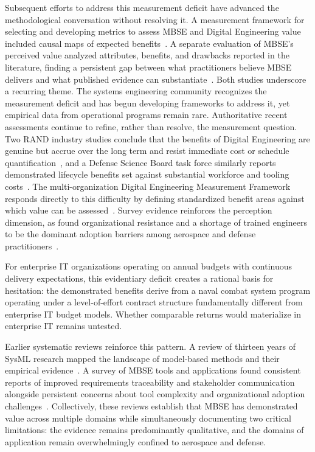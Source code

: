 Subsequent efforts to address this measurement deficit have advanced the methodological conversation without resolving it. A measurement framework for selecting and developing metrics to assess MBSE and Digital Engineering value included causal maps of expected benefits~\parencite{Henderson_2023_Metrics}. A separate evaluation of MBSE's perceived value analyzed attributes, benefits, and drawbacks reported in the literature, finding a persistent gap between what practitioners believe MBSE delivers and what published evidence can substantiate~\parencite{Campo_2023}. Both studies underscore a recurring theme. The systems engineering community recognizes the measurement deficit and has begun developing frameworks to address it, yet empirical data from operational programs remain rare. Authoritative recent assessments continue to refine, rather than resolve, the measurement question. Two RAND industry studies conclude that the benefits of Digital Engineering are genuine but accrue over the long term and resist immediate cost or schedule quantification~\parencite{RAND_DE_Supply_2024, RAND_DE_CostBenefit_2024}, and a Defense Science Board task force similarly reports demonstrated lifecycle benefits set against substantial workforce and tooling costs~\parencite{DSB_DE_2024}. The multi-organization Digital Engineering Measurement Framework responds directly to this difficulty by defining standardized benefit areas against which value can be assessed~\parencite{PSM_DE_Measurement_2022}. Survey evidence reinforces the perception dimension, as \citeauthor{Brown_Zaidi_2025} found organizational resistance and a shortage of trained engineers to be the dominant adoption barriers among aerospace and defense practitioners~\parencite{Brown_Zaidi_2025}.

For enterprise IT organizations operating on annual budgets with continuous delivery expectations, this evidentiary deficit creates a rational basis for hesitation: the demonstrated benefits derive from a naval combat system program operating under a level-of-effort contract structure fundamentally different from enterprise IT budget models. Whether comparable returns would materialize in enterprise IT remains untested.

Earlier systematic reviews reinforce this pattern. A review of thirteen years of SysML research mapped the landscape of model-based methods and their empirical evidence~\parencite{Wolny_2020}. A survey of MBSE tools and applications found consistent reports of improved requirements traceability and stakeholder communication alongside persistent concerns about tool complexity and organizational adoption challenges~\parencite{Chami_Bruel_2018}. Collectively, these reviews establish that MBSE has demonstrated value across multiple domains while simultaneously documenting two critical limitations: the evidence remains predominantly qualitative, and the domains of application remain overwhelmingly confined to aerospace and defense.

